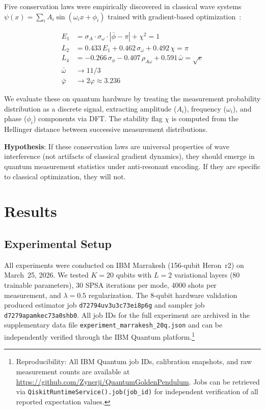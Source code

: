 \documentclass[twocolumn,showpacs,preprintnumbers,amsmath,amssymb,aps,prl]{revtex4-2}
\begin{document}
Five conservation laws were empirically discovered in classical wave systems $\psi(x) = \sum_i A_i \sin(\omega_i x + \phi_i)$ trained with gradient-based optimization~\cite{knopp2026attractor}:

\begin{align}
    E_1 &= \sigma_A \cdot \sigma_\omega \cdot |\bar{\phi} - \pi| + \chi^2 = 1 \label{eq:E1}\\
    L_2 &= 0.433\,E_1 + 0.462\,\sigma_\omega + 0.492\,\chi = \pi \label{eq:L2}\\
    L_4 &= -0.266\,\sigma_\phi - 0.407\,\rho_{A\omega} + 0.591\,\bar{\omega} = \sqrt{e} \label{eq:L4}\\
    \bar{\omega} &\to 11/3 \label{eq:omega}\\
    \bar{\varphi} &\to 2\varphi \approx 3.236 \label{eq:phi}
\end{align}

We evaluate these on quantum hardware by treating the measurement probability distribution as a discrete signal, extracting amplitude ($A_i$), frequency ($\omega_i$), and phase ($\phi_i$) components via DFT. The stability flag $\chi$ is computed from the Hellinger distance between successive measurement distributions.

\textbf{Hypothesis}: If these conservation laws are universal properties of wave interference (not artifacts of classical gradient dynamics), they should emerge in quantum measurement statistics under anti-resonant encoding. If they are specific to classical optimization, they will not.


\section{Results}
\label{sec:results}

\subsection{Experimental Setup}

All experiments were conducted on IBM Marrakesh (156-qubit Heron~r2) on March~25, 2026. We tested $K = 20$ qubits with $L = 2$ variational layers (80 trainable parameters), 30 SPSA iterations per mode, 4000 shots per measurement, and $\lambda = 0.5$ regularization. The 8-qubit hardware validation produced estimator job \texttt{d72794uv3u3c73ei8p6g} and sampler job \texttt{d7279apamkec73a0shb0}. All job IDs for the full experiment are archived in the supplementary data file \texttt{experiment\_marrakesh\_20q.json} and can be independently verified through the IBM Quantum platform.\footnote{Reproducibility: All IBM Quantum job IDs, calibration snapshots, and raw measurement counts are available at \url{https://github.com/Zynerji/QuantumGoldenPendulum}. Jobs can be retrieved via \texttt{QiskitRuntimeService().job(job\_id)} for independent verification of all reported expectation values.}
\end{document}
